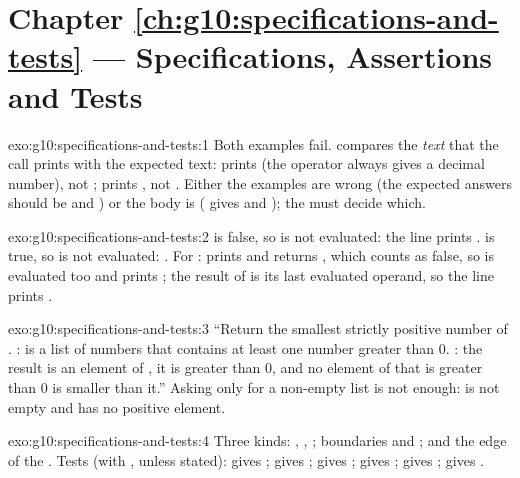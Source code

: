\section*{Chapter \ref{ch:g10:specifications-and-tests} --- Specifications, Assertions and Tests}

\begin{solution}{exo:g10:specifications-and-tests:1}
Both examples fail.  compares the \emph{text} that the call prints with the expected text:
 prints  (the operator \code{/} always gives a decimal number), not ; 
prints , not . Either the examples are wrong (the expected answers should be  and
) or the body is ( gives  and ); the  must decide which.
\end{solution}

\begin{solution}{exo:g10:specifications-and-tests:2}
 is false, so  is not evaluated: the line prints .  is true, so
 is not evaluated: . For :  prints
 and returns , which counts as false, so  is evaluated too and prints
; the result of  is its last evaluated operand, so the line prints .
\end{solution}

\begin{solution}{exo:g10:specifications-and-tests:3}
``Return the smallest strictly positive number of . :  is a list of numbers that
contains at least one number greater than $0$. : the result is an element of , it is greater
than $0$, and no element of  that is greater than $0$ is smaller than it.'' Asking only for a non-empty list
is not enough: \code{[-3, 0]} is not empty and has no positive element.
\end{solution}

\begin{solution}{exo:g10:specifications-and-tests:4}
Three kinds: , , ; boundaries  and ; and the
edge of the  . Tests (with ,  unless stated):
 gives ;  gives ;  gives ;
 gives ;  gives ;  gives
.
\end{solution}

